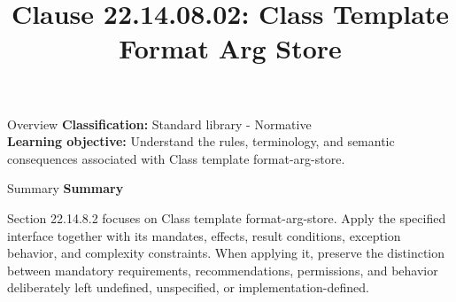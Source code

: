 \documentclass[10pt,letterpaper]{article}
\title{Clause 22.14.08.02: Class Template Format Arg Store}
\author{}
\date{}
\begin{document}
\maketitle
\begin{CornellOverviewBox}{Overview}
\textbf{Classification:} Standard library - Normative\\[2pt]
\textbf{Learning objective:} Understand the rules, terminology, and semantic consequences associated with Class template format-arg-store.
\end{CornellOverviewBox}\begin{CornellSummaryBox}{Summary}
{\sffamily\bfseries\color{Accent} Summary}\par\vspace{3pt}Section 22.14.8.2 focuses on Class template format-arg-store. Apply the specified interface together with its mandates, effects, result conditions, exception behavior, and complexity constraints. When applying it, preserve the distinction between mandatory requirements, recommendations, permissions, and behavior deliberately left undefined, unspecified, or implementation-defined.
\end{CornellSummaryBox}
\end{document}

